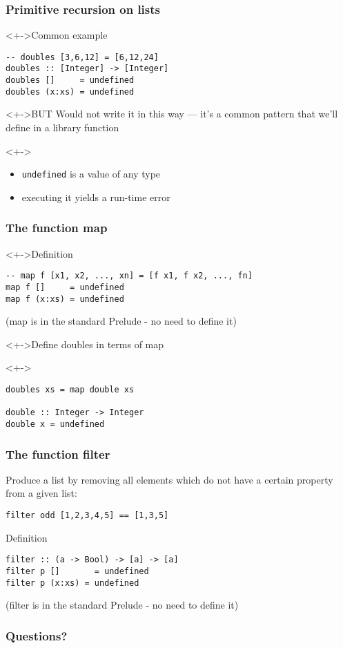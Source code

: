 \documentclass{beamer}
\begin{document}
\begin{frame}[fragile]
  \frametitle{Primitive recursion on lists}
  \begin{block}<+->{Common example}
\begin{verbatim}
-- doubles [3,6,12] = [6,12,24]
doubles :: [Integer] -> [Integer]
doubles []     = undefined
doubles (x:xs) = undefined
\end{verbatim}
  \end{block}
  \begin{alertblock}<+->{BUT}
    Would not write it in this way --- it's a common pattern that we'll define in a library function 
  \end{alertblock}
  \begin{alertblock}<+->{}
    \begin{itemize}
    \item \texttt{undefined} is a value of any type
    \item executing it yields a run-time error
    \end{itemize}
  \end{alertblock}
\end{frame}

\begin{frame}[fragile]
  \frametitle{The function map}
  \begin{block}<+->{Definition}
\begin{verbatim}
-- map f [x1, x2, ..., xn] = [f x1, f x2, ..., fn]
map f []     = undefined
map f (x:xs) = undefined
\end{verbatim}
    (map is in the standard Prelude - no need to define it)
  \end{block}
  \begin{alertblock}<+->{Define doubles in terms of map}
  \end{alertblock}
  \begin{block}<+->{}
\begin{verbatim}
doubles xs = map double xs

double :: Integer -> Integer
double x = undefined
\end{verbatim}
  \end{block}
\end{frame}
\begin{frame}[fragile]
  \frametitle{The function filter}
  Produce a list by removing all elements 
  which do not have a certain property from 
  a given list: 

\begin{verbatim}
filter odd [1,2,3,4,5] == [1,3,5]
\end{verbatim}

  \begin{block}{Definition}
\begin{verbatim}
filter :: (a -> Bool) -> [a] -> [a]
filter p []       = undefined
filter p (x:xs) = undefined
\end{verbatim}
(filter is in the standard Prelude - no need to define it)
  \end{block}
\end{frame}

\begin{frame}
  \frametitle{Questions?}
  \begin{center}
  \end{center}
\end{frame}
\end{document}
